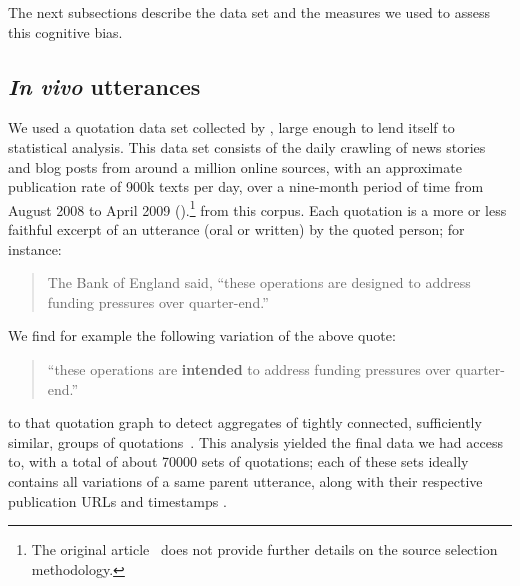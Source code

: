 The next subsections describe the data set and the measures we used to assess this cognitive bias.

\subsection{\emph{In vivo} utterances}

We used a quotation data set collected by \citet{leskovec_meme-tracking_2009}, large enough to lend itself to statistical analysis.
This data set consists of the daily crawling of news stories and blog posts from around a million online sources, with an approximate publication rate of 900k texts per day, over a nine-month period of time from August 2008 to April 2009 (\citealp{leskovec_memetracker:_2009}).\footnote{
The original article~\citep{leskovec_meme-tracking_2009} does not provide further details on the source selection methodology.
}
 from this corpus.
Each quotation is a more or less faithful excerpt of an utterance (oral or written) by the quoted person; for instance:
\begin{quote}
The Bank of England said, ``these operations are designed to address funding pressures over quarter-end.''
\end{quote}

We find for example the following variation of the above quote:
\begin{quote}
``these operations are \textbf{intended} to address funding pressures over quarter-end.''
\end{quote}
 to that quotation graph to detect aggregates of tightly connected,  sufficiently similar, groups of quotations~\citep[see again][for more details]{leskovec_meme-tracking_2009}.
This analysis yielded the final data we had access to, with a total of about \num{70000} sets of quotations; each of these sets ideally contains all variations of a same parent utterance, along with their respective publication URLs and timestamps .

